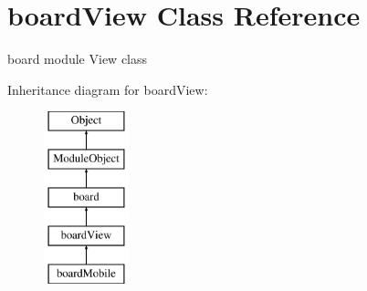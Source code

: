 \hypertarget{classboardView}{}\section{board\+View Class Reference}
\label{classboardView}


board module View class  


Inheritance diagram for board\+View\+:\begin{figure}[H]
\begin{center}
\leavevmode
\includegraphics[height=5.000000cm]{classboardView}
\end{center}
\end{figure}
